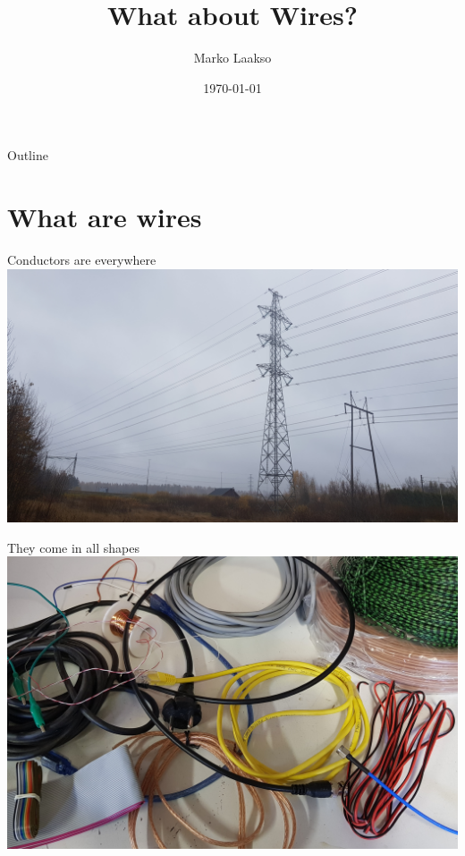 \documentclass{beamer}
\title{What about Wires?}
\author{Marko Laakso}
\institute{Asser's Lab}
\date{\today}
\begin{document}
\frame{\titlepage}

\begin{frame}{Outline}
    \tableofcontents
\end{frame}

\section{What are wires}

\begin{frame}{Conductors are everywhere}
\centering\includegraphics[keepaspectratio, width=0.94\paperwidth]{powerline_h.jpg}
\end{frame}

\begin{frame}{They come in all shapes}
\centering\includegraphics[keepaspectratio, width=0.88\paperwidth]{wires.jpg}
\end{frame}

\end{document}
